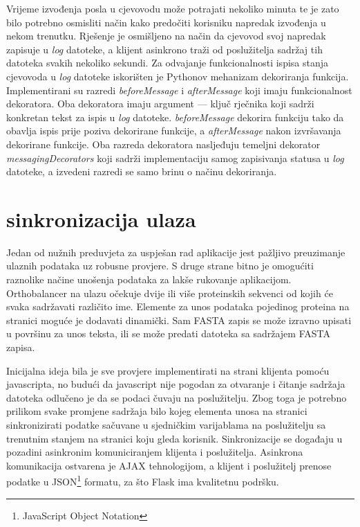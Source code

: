    
Vrijeme izvođenja posla u cjevovodu može potrajati nekoliko minuta te je zato
bilo potrebno osmisliti način kako predočiti korisniku napredak izvođenja u
nekom trenutku. Rješenje je osmišljeno na način da cjevovod svoj napredak
zapisuje u \emph{log} datoteke, a klijent asinkrono traži od poslužitelja
sadržaj tih datoteka svakih nekoliko sekundi. Za odvajanje funkcionalnosti
ispisa stanja cjevovoda u \emph{log} datoteke iskorišten je Pythonov mehanizam
dekoriranja funkcija. Implementirani su razredi \emph{beforeMessage} i
\emph{afterMessage} koji imaju funkcionalnost dekoratora. Oba dekoratora imaju
argument --- ključ rječnika koji sadrži konkretan tekst za ispis u \emph{log}
datoteke. \emph{beforeMessage} dekorira funkciju tako da obavlja ispis prije
poziva dekorirane funkcije, a \emph{afterMessage} nakon izvršavanja dekorirane
funkcije. Oba razreda dekoratora nasljeđuju temeljni dekorator
\emph{messagingDecorators} koji sadrži implementaciju samog zapisivanja statusa
u \emph{log} datoteke, a izvedeni razredi se samo brinu o načinu dekoriranja.



\section{sinkronizacija ulaza}
\label{sec:input}


Jedan od nužnih preduvjeta za uspješan rad aplikacije jest pažljivo preuzimanje
ulaznih podataka uz robusne provjere. S druge strane bitno je omogućiti
raznolike načine unošenja podataka za lakše rukovanje aplikacijom. Orthobalancer
na ulazu očekuje dvije ili više proteinskih sekvenci od kojih će svaka
sadržavati različito ime. Elemente za unos podataka pojedinog proteina na
stranici moguće je dodavati dinamički. Sam FASTA zapis se može izravno upisati u
površinu za unos teksta, ili se može predati datoteka sa sadržajem FASTA zapisa.

Inicijalna ideja bila je sve provjere implementirati na strani klijenta pomoću
javascripta, no budući da javascript nije pogodan za otvaranje i čitanje
sadržaja datoteka odlučeno je da se podaci čuvaju na poslužitelju. Zbog toga je
potrebno prilikom svake promjene sadržaja bilo kojeg elementa unosa na stranici
sinkronizirati podatke sačuvane u sjedničkim varijablama na poslužitelju sa
trenutnim stanjem na stranici koju gleda korisnik. Sinkronizacije se događaju u
pozadini asinkronim komuniciranjem klijenta i poslužitelja. Asinkrona
komunikacija ostvarena je AJAX tehnologijom, a klijent i poslužitelj prenose
podatke u JSON\footnote{JavaScript Object Notation} formatu, za što Flask ima
kvalitetnu podršku.

